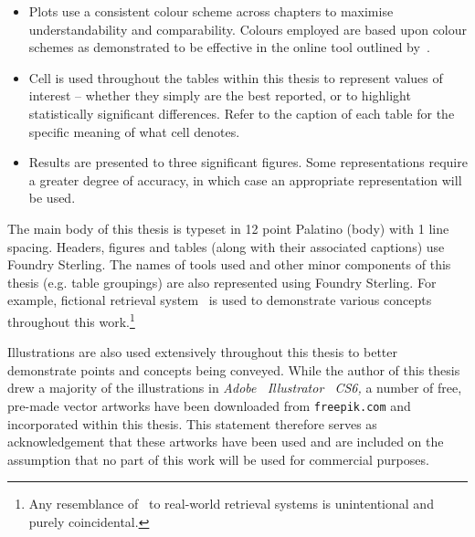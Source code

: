 \begin{preamble}
\begin{itemize}
    \item{Plots use a consistent colour scheme across chapters to maximise understandability and comparability. Colours employed are based upon colour schemes as demonstrated to be effective in the online tool outlined by~\cite{harrower2003colorbrewer}.}
    
    \item{Cell  is used throughout the tables within this thesis to represent values of interest -- whether they simply are the best reported, or to highlight statistically significant differences. Refer to the caption of each table for the specific meaning of what cell  denotes.}
    
    \item{Results are presented to three significant figures. Some representations require a greater degree of accuracy, in which case an appropriate representation will be used.}
    
\end{itemize}



The main body of this thesis is typeset in 12 point Palatino (body) with 1 line spacing. Headers, figures and tables (along with their associated captions) use \headerfont\selectfont Foundry Sterling\normalfont\selectfont. The names of tools used and other minor components of this thesis (e.g. table groupings) are also represented using \headerfont\selectfont Foundry Sterling\normalfont\selectfont. For example, fictional retrieval system \searchlogo~is used to demonstrate various concepts throughout this work.\footnote{Any resemblance of \searchlogo~to real-world retrieval systems is unintentional and purely coincidental.}

Illustrations are also used extensively throughout this thesis to better demonstrate points and concepts being conveyed. While the author of this thesis drew a majority of the illustrations in \emph{Adobe \textregistered~Illustrator \textregistered~CS6,} a number of free, pre-made vector artworks have been downloaded from \texttt{freepik.com} and incorporated within this thesis. This statement therefore serves as acknowledgement that these artworks have been used and are included on the assumption that no part of this work will be used for commercial purposes.


\end{preamble}

